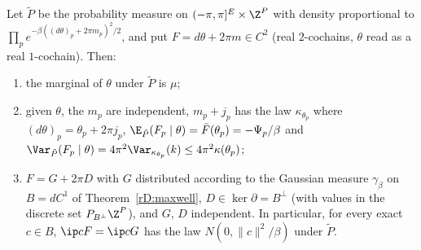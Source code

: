 \begin{lemma}\label{rDtwo:villaindual}
Let $\tilde P$ be the probability measure on $(-\pi,\pi]^E\times\Z^P$ with
density proportional to $\prod_pe^{-\beta((d\theta)_p+2\pi m_p)^2/2}$, and
put $F=d\theta+2\pi m\in C^2$ (real $2$-cochains, $\theta$ read as a real
$1$-cochain). Then:
\begin{enumerate}[label=\textup{(\roman*)},leftmargin=*]
\item the marginal of $\theta$ under $\tilde P$ is $\mu$;
\item given $\theta$, the $m_p$ are independent, $m_p+j_p$ has the law
$\kappa_{\theta_p}$ where $(d\theta)_p=\theta_p+2\pi j_p$, $\E_{\tilde P}(F_p
\mid\theta)=\bar F(\theta_p)=-\Psi_p/\beta$ and $\Var_{\tilde P}(F_p\mid
\theta)=4\pi^2\Var_{\kappa_{\theta_p}}(k)\le4\pi^2\kappa(\theta_p)$;
\item $F=G+2\pi D$ with $G$ distributed according to the Gaussian measure
$\gamma_\beta$ on $B=dC^1$ of Theorem~\ref{rD:maxwell}, $D\in\ker\partial=
B^\perp$ (with values in the discrete set $P_{B^\perp}\Z^P$), and $G$, $D$
independent. In particular, for every exact $c\in B$, $\ip cF=\ip cG$ has
the law $N(0,\lVert c\rVert^2/\beta)$ under $\tilde P$.
\end{enumerate}
\end{lemma}

